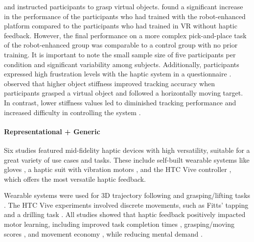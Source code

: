 \cite{Chappell2022} and \cite{Perez2023} instructed participants to grasp virtual objects.
\cite{Chappell2022} found a significant increase in the performance of the participants who had trained with the robot-enhanced platform compared to the participants who had trained in VR without haptic feedback. However, the final performance on a more complex pick-and-place task of the robot-enhanced group was comparable to a control group with no prior training. It is important to note the small sample size of five participants per condition and significant variability among subjects. Additionally, participants expressed high frustration levels with the haptic system in a questionnaire \cite{Chappell2022}.
\cite{Perez2023} observed that higher object stiffness improved tracking accuracy when participants grasped a virtual object and followed a horizontally moving target. In contrast, lower stiffness values led to diminished tracking performance and increased difficulty in controlling the system \cite{Perez2023}.

\paragraph{Representational + Generic} \label{sec:representationalgeneric}

Six studies featured mid-fidelity haptic devices with high versatility, suitable for a great variety of use cases and tasks. These include self-built wearable systems like gloves \cite{LiuH2019, Trinitatova2023}, a haptic suit with vibration motors \cite{Xia2023}, and the HTC Vive controller \cite{Vasudevan2020, Yang2023, McAnally2023}, which offers the most versatile haptic feedback.

Wearable systems were used for 3D trajectory following \cite{Trinitatova2023, Xia2023} and grasping/lifting tasks \cite{LiuH2019}. The HTC Vive experiments involved discrete movements, such as Fitts' tapping \cite{Vasudevan2020, McAnally2023} and a drilling task \cite{Yang2023}. All studies showed that haptic feedback positively impacted motor learning, including improved task completion times \cite{McAnally2023}, grasping/moving scores \cite{LiuH2019}, and movement economy \cite{McAnally2023}, while reducing mental demand \cite{Trinitatova2023}. 

